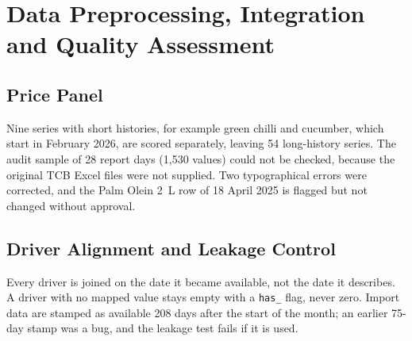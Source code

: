 \documentclass[12pt]{report}
\begin{document}
\section{Data Preprocessing, Integration and Quality Assessment}
\subsection{Price Panel}
Nine series with short histories, for example green chilli and cucumber, which start in February 2026, are scored separately, leaving 54 long-history series. The audit sample of 28 report days (1,530 values) could not be checked, because the original TCB Excel files were not supplied. Two typographical errors were corrected, and the Palm Olein 2~L row of 18 April 2025 is flagged but not changed without approval.

\subsection{Driver Alignment and Leakage Control}
Every driver is joined on the date it became available, not the date it describes. A driver with no mapped value stays empty with a \texttt{has\_} flag, never zero. Import data are stamped as available 208 days after the start of the month; an earlier 75-day stamp was a bug, and the leakage test fails if it is used.
\end{document}
